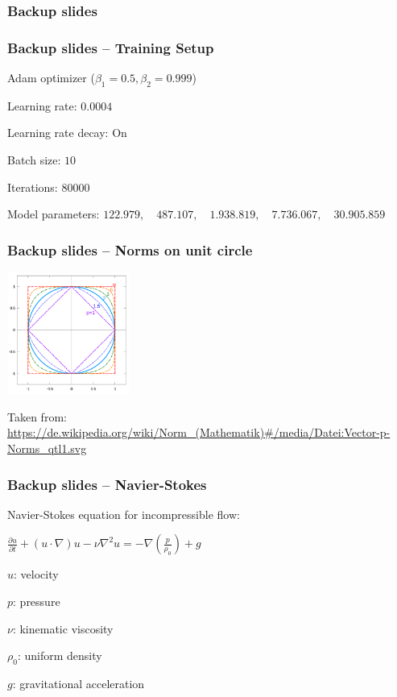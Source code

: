 \begin{frame}
    \frametitle{Backup slides}

\end{frame}
\clearpage

\begin{frame}
    \frametitle{Backup slides -- Training Setup}
    \vspace*{0.8cm}

Adam optimizer ($\beta_1 = 0.5, \beta_2 = 0.999$)

Learning rate: $0.0004$

Learning rate decay: On

Batch size: $10$

Iterations: $80000$

Model parameters: \newline $122.979, \quad 487.107, \quad 1.938.819, \quad 7.736.067, \quad  30.905.859$

\end{frame}
\clearpage

\begin{frame}
    \frametitle{Backup slides -- Norms on unit circle}
	\vspace*{1.25cm}
	\includegraphics[width=0.3\textwidth, height=0.5\textheight]{./Ressourcen/Praesentation/Bilder/norms.png}

	Taken from: \url{https://de.wikipedia.org/wiki/Norm_(Mathematik)\#/media/Datei:Vector-p-Norms_qtl1.svg}

\end{frame}
\clearpage

\begin{frame}
    \frametitle{Backup slides -- Navier-Stokes}
\vspace*{0.8cm}

Navier-Stokes equation for incompressible flow:

$\frac{\partial u}{\partial t} + (u \cdot \nabla)u - \nu \nabla^2 u = - \nabla (\frac{p}{\rho_0}) + g$\newline

\begin{PraesentationAufzaehlung}
\item $u$: velocity
\item $p$: pressure
\item $\nu$: kinematic viscosity
\item $\rho_0$: uniform density
\item $g$: gravitational acceleration
\end{PraesentationAufzaehlung}

\end{frame}
\clearpage

